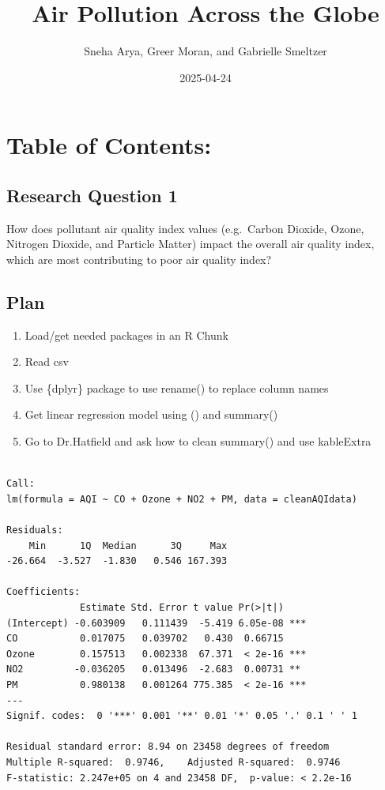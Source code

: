\documentclass[
  letterpaper,
  DIV=11,
  numbers=noendperiod]{scrartcl}
\title{Air Pollution Across the Globe}
\author{Sneha Arya, Greer Moran, and Gabrielle Smeltzer}
\date{2025-04-24}
\providecommand{\tightlist}{%
  \setlength{\itemsep}{0pt}\setlength{\parskip}{0pt}}\usepackage{longtable,booktabs,array}
\begin{document}
\maketitle


\section{Table of Contents:}\label{table-of-contents}

\subsection{Research Question 1}\label{research-question-1}

How does pollutant air quality index values (e.g.~Carbon Dioxide, Ozone,
Nitrogen Dioxide, and Particle Matter) impact the overall air quality
index, which are most contributing to poor air quality index?

\subsection{Plan}\label{plan}

\begin{enumerate}
\def\labelenumi{\arabic{enumi}.}
\tightlist
\item
  Load/get needed packages in an R Chunk
\item
  Read csv
\item
  Use \{dplyr\} package to use rename() to replace column names
\item
  Get linear regression model using () and summary()
\item
  Go to Dr.Hatfield and ask how to clean summary() and use kableExtra
\end{enumerate}

\begin{verbatim}

Call:
lm(formula = AQI ~ CO + Ozone + NO2 + PM, data = cleanAQIdata)

Residuals:
    Min      1Q  Median      3Q     Max 
-26.664  -3.527  -1.830   0.546 167.393 

Coefficients:
             Estimate Std. Error t value Pr(>|t|)    
(Intercept) -0.603909   0.111439  -5.419 6.05e-08 ***
CO           0.017075   0.039702   0.430  0.66715    
Ozone        0.157513   0.002338  67.371  < 2e-16 ***
NO2         -0.036205   0.013496  -2.683  0.00731 ** 
PM           0.980138   0.001264 775.385  < 2e-16 ***
---
Signif. codes:  0 '***' 0.001 '**' 0.01 '*' 0.05 '.' 0.1 ' ' 1

Residual standard error: 8.94 on 23458 degrees of freedom
Multiple R-squared:  0.9746,    Adjusted R-squared:  0.9746 
F-statistic: 2.247e+05 on 4 and 23458 DF,  p-value: < 2.2e-16
\end{verbatim}
\end{document}
